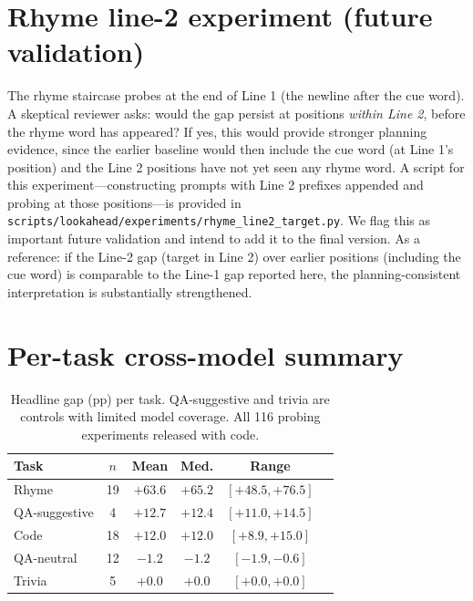 \documentclass[11pt]{article}
\begin{document}
\section{Rhyme line-2 experiment (future validation)}
\label{app:line2}

The rhyme staircase probes at the end of Line 1 (the newline after the
cue word). A skeptical reviewer asks: would the gap persist at positions
\emph{within Line 2}, before the rhyme word has appeared? If yes, this would
provide stronger planning evidence, since the earlier baseline would then
include the cue word (at Line 1's position) and the Line 2 positions have not
yet seen any rhyme word. A script for this experiment---constructing prompts
with Line 2 prefixes appended and probing at those positions---is provided in
\texttt{scripts/lookahead/experiments/rhyme\_line2\_target.py}. We flag this
as important future validation and intend to add it to the final version. As a
reference: if the Line-2 gap (target in Line 2) over earlier positions
(including the cue word) is comparable to the Line-1 gap reported here, the
planning-consistent interpretation is substantially strengthened.

\section{Per-task cross-model summary}
\label{app:summary}

\begin{table}[h]
\centering\small
\begin{tabular}{@{}lccccc@{}}
\toprule
\textbf{Task} & \textbf{$n$} & \textbf{Mean} & \textbf{Med.} & \textbf{Range} \\
\midrule
Rhyme & 19 & $+63.6$ & $+65.2$ & $[+48.5,+76.5]$ \\
QA-suggestive & 4 & $+12.7$ & $+12.4$ & $[+11.0,+14.5]$ \\
Code & 18 & $+12.0$ & $+12.0$ & $[+8.9,+15.0]$ \\
QA-neutral & 12 & $-1.2$ & $-1.2$ & $[-1.9,-0.6]$ \\
Trivia & 5 & $+0.0$ & $+0.0$ & $[+0.0,+0.0]$ \\
\bottomrule
\end{tabular}
\caption{Headline gap (pp) per task. QA-suggestive and trivia are controls
with limited model coverage. All 116 probing experiments released with code.}
\label{tab:summary}
\end{table}
\end{document}
